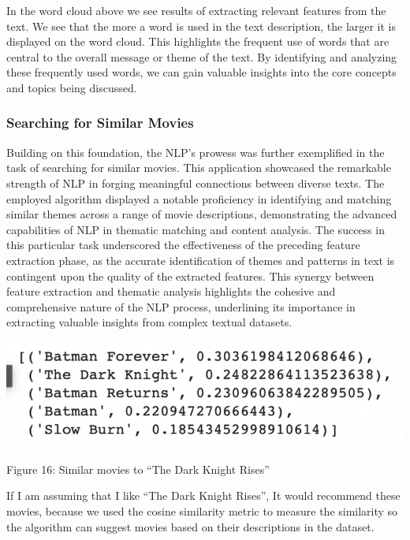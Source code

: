 \documentclass{article}
\begin{document}
\begin{multicols}{2}
In the word cloud above we see results of extracting relevant features from the text. We see that the more a word is used in the text description, the larger it is displayed on the word cloud. This highlights the frequent use of words that are central to the overall message or theme of the text. By identifying and analyzing these frequently used words, we can gain valuable insights into the core concepts and topics being discussed.

\subsubsection{Searching for Similar Movies}

Building on this foundation, the NLP's prowess was further exemplified in the task of searching for similar movies. This application showcased the remarkable strength of NLP in forging meaningful connections between diverse texts. The employed algorithm displayed a notable proficiency in identifying and matching similar themes across a range of movie descriptions, demonstrating the advanced capabilities of NLP in thematic matching and content analysis. The success in this particular task underscored the effectiveness of the preceding feature extraction phase, as the accurate identification of themes and patterns in text is contingent upon the quality of the extracted features. This synergy between feature extraction and thematic analysis highlights the cohesive and comprehensive nature of the NLP process, underlining its importance in extracting valuable insights from complex textual datasets. 

\includegraphics[scale=.5]{img/nlp4.png}

{\small
  Figure 16: Similar movies to “The Dark Knight Rises”
  \par
  \vspace{6pt}
}

If I am assuming that I like “The Dark Knight Rises”, It would recommend these movies, because we used the cosine similarity metric to measure the similarity so the algorithm can suggest movies based on their descriptions in the dataset. 


\end{multicols}
\end{document}
